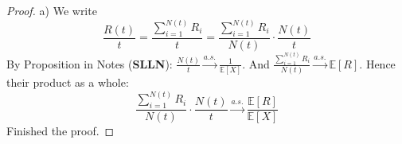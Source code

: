 \documentclass[a4paper, 10pt]{article}
\theoremstyle{definition}
\theoremstyle{hSol}
\begin{document}
\begin{proof} a) We write
\begin{equation}
  \frac{R(t)}{t} = \frac{\sum_{i=1}^{N(t)}R_i}{t} = \frac{\sum_{i=1}^{N(t)}R_i}{N(t)} \cdot \frac{N(t)}{t}
\end{equation}
By Proposition in Notes (\textbf{SLLN}): $\frac{N(t)}{t} \xrightarrow{a.s.} \frac{1}{\mathbb{E}\left[X\right]}$. And $\frac{\sum_{i=1}^{N(t)}R_i}{N(t)} \xrightarrow{a.s.} \mathbb{E}\left[R\right]$. Hence their product as a whole:
\begin{equation}
  \frac{\sum_{i=1}^{N(t)}R_i}{N(t)} \cdot \frac{N(t)}{t} \xrightarrow{a.s.} \frac{\mathbb{E}\left[R\right]}{\mathbb{E}\left[X\right]}
\end{equation}
Finished the proof.
\end{proof}
\end{document}
